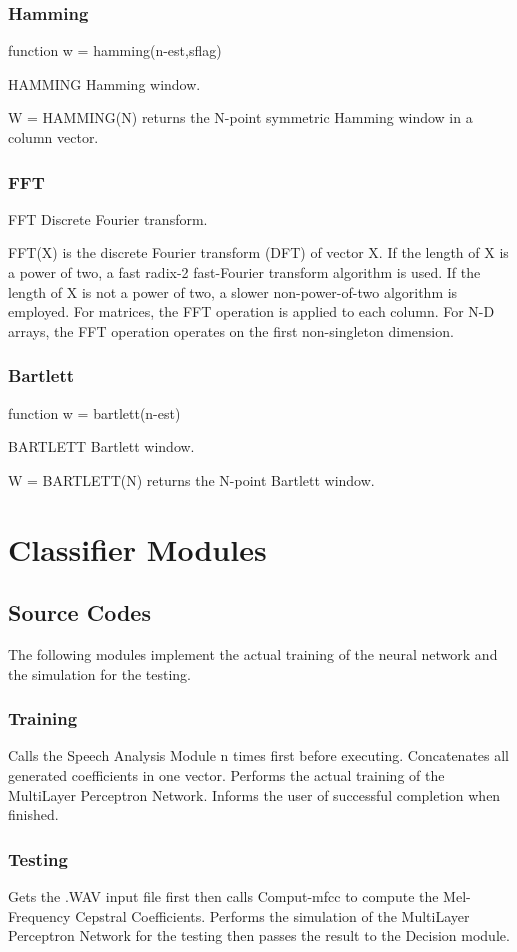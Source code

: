 \subsubsection{Hamming}
function w = hamming(n-est,sflag)

HAMMING Hamming window.

   W = HAMMING(N) returns the N-point symmetric Hamming window
       in a column vector.

\subsubsection{FFT}
FFT Discrete Fourier transform.

   FFT(X) is the discrete Fourier transform (DFT) of vector X.  If the
   length of X is a power of two, a fast radix-2 fast-Fourier
   transform algorithm is used.  If the length of X is not a
   power of two, a slower non-power-of-two algorithm is employed.
   For matrices, the FFT operation is applied to each column.
   For N-D arrays, the FFT operation operates on the first
   non-singleton dimension.

\subsubsection{Bartlett}
function w = bartlett(n-est)

BARTLETT Bartlett window.

   W = BARTLETT(N) returns the N-point Bartlett window.


\section{Classifier Modules}
\subsection{Source Codes}
The following modules implement the actual training of the neural
network and the simulation for the testing.

\subsubsection{Training}
Calls the Speech Analysis Module n times first before executing.
Concatenates all generated coefficients in one vector. Performs
the actual training of the MultiLayer Perceptron Network. Informs
the user of successful completion when finished.

\subsubsection{Testing}
Gets the .WAV input file first then calls Comput-mfcc to compute
the Mel-Frequency Cepstral Coefficients. Performs the simulation
of the MultiLayer Perceptron Network for the testing then passes
the result to the Decision module.

